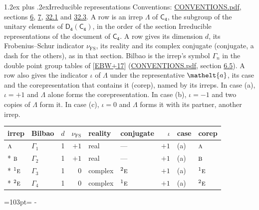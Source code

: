 \documentclass[10pt,a4paper]{article}
\makeatletter
\renewcommand\section{\@startsection{section}{1}{\z@}{-3ex plus -1ex minus -.2ex}%
  {1.2ex plus .2ex}{\normalfont\large\sffamily\bfseries\color{parttitle}}}
\newcommand{\needspace}[1]{\par\penalty-100\begingroup\dimen0=#1\relax\dimen2=\pagegoal
  \advance\dimen2-\pagetotal\ifdim\dimen0>\dimen2\relax\ifdim\dimen2>0pt\vfil\break\fi\fi
  \endgroup}
\numberwithin{equation}{section}
\newcommand{\eltfont}[1]{{\let\sigma\eltsigma\mathelt{#1}}}
\newcommand{\grp}[1]{\mathsf{#1}}
\newcommand{\irr}[1]{\text{\normalfont\scshape #1}}
\newcommand{\conjpair}[1]{{}^{#1}}
\newcommand{\elt}[1]{\eltfont{#1}}
\newcommand{\fsind}{\nu_{\mathrm{FS}}}
\makeatother
\begin{document}
\section{Irreducible representations}\label{s:irreps}
Conventions: \href{../../CONVENTIONS.pdf}{CONVENTIONS.pdf}, sections \href{../../../rotation/CONVENTIONS.pdf\#conv.6}{6}, \href{../../../rotation/CONVENTIONS.pdf\#conv.7}{7}, \href{../../CONVENTIONS.pdf\#conv.32.1}{32.1} and \href{../../CONVENTIONS.pdf\#conv.32.3}{32.3}.
\leavevmode\label{n:irrep.Delta}A row is an irrep $\Lambda$ of $\grp{C_{4}}$, the subgroup of the unitary elements of $\grp{D_{4}}(\grp{C_{4}})$, in the order of the section Irreducible representations of the document of \href{../../../rotation/data/pdf/C4.pdf}{$\grp{C_{4}}$}. \label{n:index.dimension}\label{n:index.frobenius}\label{n:head.irrep}\label{n:head.reality}\label{n:head.conjugate}A row gives its dimension $d$, its Frobenius--Schur indicator $\fsind$, its reality and its complex conjugate (conjugate, a dash for the others), as in that section. \label{n:head.bilbao}\label{n:irrep.alias.gamma}Bilbao is the irrep's symbol $\Gamma_n$ in the double point group tables of [\href{../../../REFERENCES.pdf\#ref.EBW+17}{EBW+17}] (\href{../../CONVENTIONS.pdf}{CONVENTIONS.pdf}, section \href{../../../rotation/CONVENTIONS.pdf\#conv.6.5}{6.5}). \label{n:head.case.corep}\label{n:head.corep}A row also gives the indicator $\iota$ of $\Lambda$ under the representative $\elt{a}$, its case and the corepresentation that contains it (corep), named by its irreps. In case (a), $\iota = +1$ and $\Lambda$ alone forms the corepresentation. In case (b), $\iota = -1$ and two copies of $\Lambda$ form it. In case (c), $\iota = 0$ and $\Lambda$ forms it with its partner, another irrep.
\setlength{\emergencystretch}{2em}\par\setlength{\emergencystretch}{0pt}
{\small\renewcommand{\arraystretch}{1.25}\setlength{\tabcolsep}{4pt}\begin{longtable}{@{}llrrllrll@{}}\toprule
irrep & Bilbao & $d$ & $\fsind$ & reality & conjugate & $\iota$ & case & corep\\\midrule\endhead
\bottomrule\endfoot\endlastfoot
$\irr{a}$ & $\Gamma_{1}$ & 1 & $+1$ & real & --- & $+1$ & (a) & $\irr{a}$\\*
$\irr{b}$ & $\Gamma_{2}$ & 1 & $+1$ & real & --- & $+1$ & (a) & $\irr{b}$\\*
$\conjpair{1}\irr{e}$ & $\Gamma_{3}$ & 1 & $0$ & complex & $\conjpair{2}\irr{e}$ & $+1$ & (a) & $\conjpair{1}\irr{e}$\\*
$\conjpair{2}\irr{e}$ & $\Gamma_{4}$ & 1 & $0$ & complex & $\conjpair{1}\irr{e}$ & $+1$ & (a) & $\conjpair{2}\irr{e}$\\
\bottomrule\end{longtable}}
\needspace{103pt}
\end{document}
